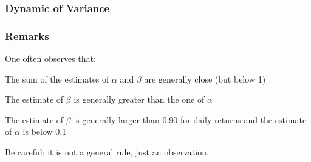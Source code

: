\documentclass{beamer}
\newenvironment{wideitemize}{\itemize\addtolength{\itemsep}{10pt}}{\enditemize}
\newenvironment{wideenumerate}{\enumerate\addtolength{\itemsep}{10pt}}{\endenumerate}
\begin{document}
\begin{frame}
  \frametitle{Dynamic of Variance}
\end{frame}


\begin{frame}
  \frametitle{Remarks}

  \begin{wideitemize}
  \item One often observes that:
      \begin{wideenumerate}
  \item The sum of the estimates of $\alpha$ and $\beta$ are generally close (but below 1)
  \item The estimate of $\beta$ is generally greater than the one of $\alpha$
  \item The estimate of $\beta$ is generally larger than 0.90 for daily returns and the estimate of $\alpha$ is below 0.1
  \end{wideenumerate}
  \item Be careful: it is not a general rule, just an observation.
  \end{wideitemize}  
\end{frame}
\end{document}
